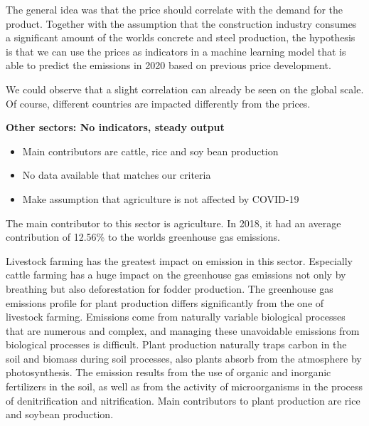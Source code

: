 The general idea was that the price should correlate with the demand for the product. Together with the assumption that the construction industry consumes a significant amount of the worlds concrete and steel production, the hypothesis is that we can use the prices as indicators in a machine learning model that is able to predict the emissions in 2020 based on previous price development.

We could observe that a slight correlation can already be seen on the global scale. Of course, different countries are impacted differently from the prices. 



\vspace{1em}
\textbf{Other sectors: No indicators, steady output} %
\begin{itemize}
	\item Main contributors are cattle, rice and soy bean production
	\item No data available that matches our criteria
	\item Make assumption that agriculture is not affected by COVID-19
\end{itemize}

The main contributor to this sector is agriculture. In 2018, it had an average contribution of 12.56\% to the worlds greenhouse gas emissions.

Livestock farming has the greatest impact on \co emission in this sector. Especially cattle farming has a huge impact on the greenhouse gas emissions not only by breathing but also deforestation for fodder production. 
The greenhouse gas emissions profile for plant production differs significantly from the one of livestock farming. Emissions come from naturally variable biological processes that are numerous and complex, and managing these unavoidable emissions from biological processes is difficult. Plant production naturally traps carbon in the soil and biomass during soil processes, also plants absorb \co from the atmosphere by photosynthesis. The emission results from the use of organic and inorganic fertilizers in the soil, as well as from the activity of microorganisms in the process of denitrification and nitrification. Main contributors to plant production are rice and soybean production.

